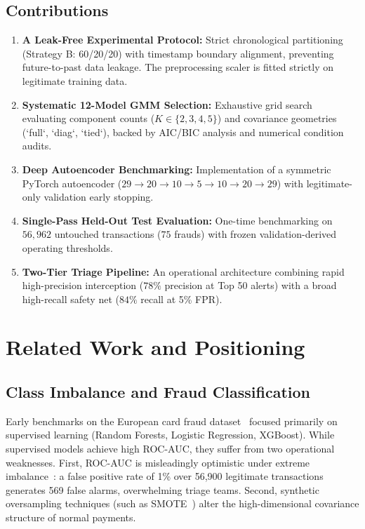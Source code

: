 \documentclass[conference]{IEEEtran}
\begin{document}
\subsection{Contributions}
\begin{enumerate}
    \item \textbf{A Leak-Free Experimental Protocol:} Strict chronological partitioning (Strategy B: 60/20/20) with timestamp boundary alignment, preventing future-to-past data leakage. The preprocessing scaler is fitted strictly on legitimate training data.
    \item \textbf{Systematic 12-Model GMM Selection:} Exhaustive grid search evaluating component counts ($K \in \{2, 3, 4, 5\}$) and covariance geometries (`full`, `diag`, `tied`), backed by AIC/BIC analysis and numerical condition audits.
    \item \textbf{Deep Autoencoder Benchmarking:} Implementation of a symmetric PyTorch autoencoder ($29 \to 20 \to 10 \to 5 \to 10 \to 20 \to 29$) with legitimate-only validation early stopping.
    \item \textbf{Single-Pass Held-Out Test Evaluation:} One-time benchmarking on $56,962$ untouched transactions ($75$ frauds) with frozen validation-derived operating thresholds.
    \item \textbf{Two-Tier Triage Pipeline:} An operational architecture combining rapid high-precision interception ($78\%$ precision at Top 50 alerts) with a broad high-recall safety net ($84\%$ recall at 5\% FPR).
\end{enumerate}

\section{Related Work and Positioning}
\subsection{Class Imbalance and Fraud Classification}
Early benchmarks on the European card fraud dataset~\cite{dalpozzolo2015} focused primarily on supervised learning (Random Forests, Logistic Regression, XGBoost). While supervised models achieve high ROC-AUC, they suffer from two operational weaknesses. First, ROC-AUC is misleadingly optimistic under extreme imbalance~\cite{davis2006}: a false positive rate of 1\% over 56,900 legitimate transactions generates 569 false alarms, overwhelming triage teams. Second, synthetic oversampling techniques (such as SMOTE~\cite{chawla2002}) alter the high-dimensional covariance structure of normal payments.
\end{document}
